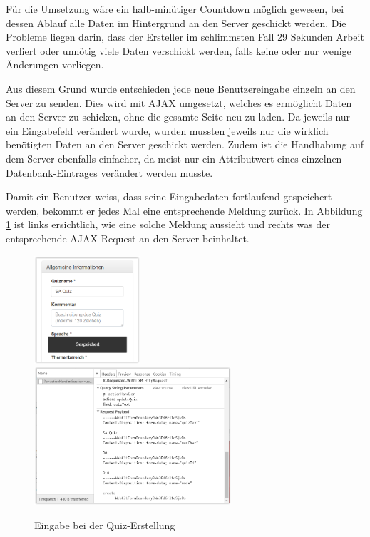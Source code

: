 Für die Umsetzung wäre ein halb-minütiger Countdown möglich gewesen, bei dessen Ablauf alle Daten im Hintergrund an den Server geschickt werden. Die Probleme liegen darin, dass der Ersteller im schlimmsten Fall 29 Sekunden Arbeit verliert oder unnötig viele Daten verschickt werden, falls keine oder nur wenige Änderungen vorliegen.

Aus diesem Grund wurde entschieden jede neue Benutzereingabe einzeln an den Server zu senden. Dies wird mit \acrfull{AJAX} umgesetzt, welches es ermöglicht Daten an den Server zu schicken, ohne die gesamte Seite neu zu laden. Da jeweils nur ein Eingabefeld verändert wurde, wurden mussten jeweils nur die wirklich benötigten Daten an den Server geschickt werden. Zudem ist die Handhabung auf dem Server ebenfalls einfacher, da meist nur ein Attributwert eines einzelnen Datenbank-Eintrages verändert werden musste.

Damit ein Benutzer weiss, dass seine Eingabedaten fortlaufend gespeichert werden, bekommt er jedes Mal eine entsprechende Meldung zurück. In Abbildung \ref{fig:Eingabe bei der Quiz-Erstellung} ist links ersichtlich, wie eine solche Meldung aussieht und rechts was der entsprechende \acrshort{AJAX}-Request an den Server beinhaltet.


\begin{figure}
	\includegraphics[width=0.35\textwidth]{Images/Quiz_Erstellen_Gespeichert.PNG}
	\includegraphics[width=0.65\textwidth]{Images/Quiz_Erstellen_Request.PNG}
	\caption{Eingabe bei der Quiz-Erstellung}
	\label{fig:Eingabe bei der Quiz-Erstellung}
\end{figure}

